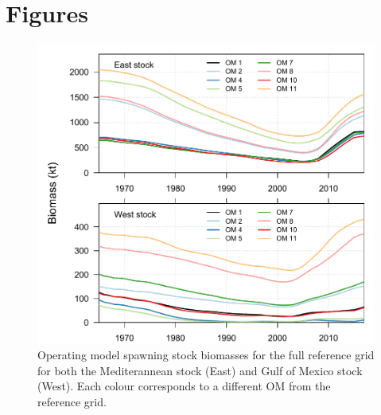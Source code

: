 \documentclass[]{article}
\begin{document}
\hypertarget{figures}{%
\section{Figures}\label{figures}}

\begin{figure}[htb]

{\centering \includegraphics[width=0.9\linewidth]{data/OMbiomass} 

}

\caption{Operating model spawning stock biomasses for the full reference grid for both the Mediterannean stock (East) and Gulf of Mexico stock (West). Each colour corresponds to a different OM from the reference grid.}\label{fig:heatMapPlot}
\end{figure}
\end{document}
